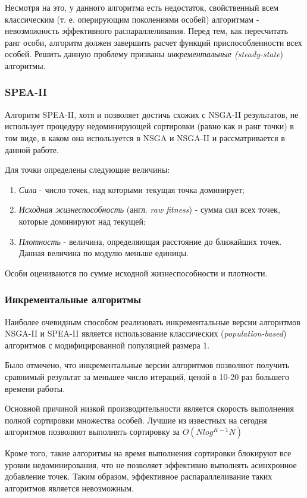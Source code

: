 Несмотря на это, у данного алгоритма есть недостаток, свойственный всем классическим
(т. е. оперирующим поколениями особей) алгоритмам - невозможность эффективного распараллеливания.
Перед тем, как пересчитать ранг особи, алгоритм должен завершить расчет функций приспособленности 
всех особей. Решить данную проблему призваны \textit{инкрементальные (steady-state}) алгоритмы.
\cite{max_me_ss_nsga2}

\subsubsection{SPEA-II}
Алгоритм SPEA-II, хотя и позволяет достичь схожих с NSGA-II результатов, не использует процедуру 
недоминирующей сортировки (равно как и ранг точки) в том виде, в каком она используется в NSGA и 
NSGA-II и рассматривается в данной работе.

Для точки определены следующие величины: \cite{spea2}
\begin{enumerate}
 \item \textit{Сила} - число точек, над которыми текущая точка доминирует;
 \item \textit{Исходная жизнеспособность} (англ. \textit{raw fitness}) - сумма сил всех точек, 
	которые доминируют над текущей;
 \item \textit{Плотность} - величина, определяющая расстояние до ближайших точек.
	Данная величина по модулю меньше единицы.
\end{enumerate}

Особи оцениваются по сумме исходной жизнеспособности и плотности.

\subsubsection{Инкрементальные алгоритмы}
Наиболее очевидным способом реализовать инкрементальные версии алгоритмов NSGA-II и SPEA-II
является использование классических (\textit{population-based}) алгоритмов с модифицированной
популяцией размера 1. \cite{inc_nsga2_spea2}

Было отмечено, что инкрементальные версии алгоритмов позволяют получить сравнимый результат
за меньшее число итераций, ценой в 10-20 раз большего времени работы.

Основной причиной низкой производительности является скорость выполнения полной сортировки 
множества особей. Лучшие из известных на сегодня алгоритмов позволяют выполнять сортировку 
за $O(Nlog^{K-1}N)$

Кроме того, такие алгоритмы на время выполнения сортировки блокируют все уровни недоминирования, 
что не позволяет эффективно выполнять асинхронное добавление точек. Таким образом, эффективное 
распараллеливание таких алгоритмов является невозможным.

